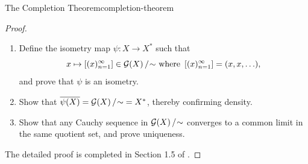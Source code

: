 \documentclass{article}
\newcommand*\cauchyquotient{%
    \ensuremath\mathcal{G}{\left(X\right)/\hspace{-.5ex}\sim}}
\numberwithin{equation}{section}
\numberwithin{figure}{section}
\begin{document}
\begin{theorem}{The Completion Theorem}{completion-theorem}
\begin{proof}
\begin{enumerate}
\begin{equation}
                \end{equation}
            \item Define the isometry map $ \psi \colon X \to X^* $ such that
                \begin{equation}
                    x \mapsto \left[ (x)_{n=1}^\infty \right] \in
                    \cauchyquotient\text{ where } \left[ (x)_{n=1}^\infty
                    \right] = (x, x, \ldots),
                \end{equation}
                and prove that $ \psi $ is an isometry.
            \item Show that $ \overline{\psi{(X)}} = \cauchyquotient= X^* $,
                thereby confirming density.
            \item Show that any Cauchy sequence in $ \cauchyquotient $ converges
                to a common limit in the same quotient set, and prove
                uniqueness.
        \end{enumerate}
        The detailed proof is completed in Section 1.5 of
        \autocite{Shirali:2006}.
    \end{proof}
\end{theorem}
\end{document}
